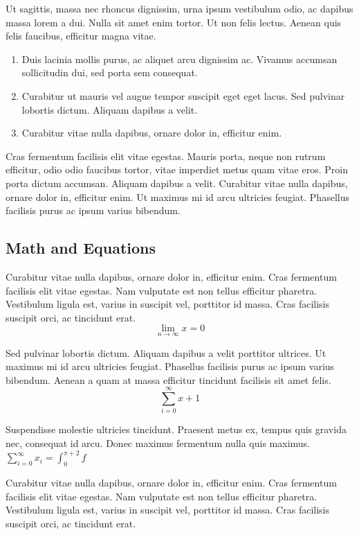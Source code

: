 \documentclass[sigconf, nonacm]{acmart}
\begin{document}
Ut sagittis, massa nec rhoncus dignissim, urna ipsum vestibulum odio, ac dapibus massa lorem a dui. Nulla sit amet enim tortor. Ut non felis lectus. Aenean quis felis faucibus, efficitur magna vitae. 

\begin{enumerate}
\item Duis lacinia mollis purus, ac aliquet arcu dignissim ac. Vivamus accumsan sollicitudin dui, sed porta sem consequat.
\item Curabitur ut mauris vel augue tempor suscipit eget eget lacus. Sed pulvinar lobortis dictum. Aliquam dapibus a velit.
\item Curabitur vitae nulla dapibus, ornare dolor in, efficitur enim.
\end{enumerate}

Cras fermentum facilisis elit vitae egestas. Mauris porta, neque non rutrum efficitur, odio odio faucibus tortor, vitae imperdiet metus quam vitae eros. Proin porta dictum accumsan. Aliquam dapibus a velit. Curabitur vitae nulla dapibus, ornare dolor in, efficitur enim. Ut maximus mi id arcu ultricies feugiat. Phasellus facilisis purus ac ipsum varius bibendum.

\subsection{Math and Equations}

Curabitur vitae nulla dapibus, ornare dolor in, efficitur enim. Cras fermentum facilisis elit vitae egestas. Nam vulputate est non tellus efficitur pharetra. Vestibulum ligula est, varius in suscipit vel, porttitor id massa. Cras facilisis suscipit orci, ac tincidunt erat.
\begin{equation}
  \lim_{n\rightarrow \infty}x=0
\end{equation}

Sed pulvinar lobortis dictum. Aliquam dapibus a velit porttitor ultrices. Ut maximus mi id arcu ultricies feugiat. Phasellus facilisis purus ac ipsum varius bibendum. Aenean a quam at massa efficitur tincidunt facilisis sit amet felis. 
\begin{displaymath}
  \sum_{i=0}^{\infty} x + 1
\end{displaymath}

Suspendisse molestie ultricies tincidunt. Praesent metus ex, tempus quis gravida nec, consequat id arcu. Donec maximus fermentum nulla quis maximus.
$ \sum_{i=0}^{\infty}x_i=\int_{0}^{\pi+2} f$

Curabitur vitae nulla dapibus, ornare dolor in, efficitur enim. Cras fermentum facilisis elit vitae egestas. Nam vulputate est non tellus efficitur pharetra. Vestibulum ligula est, varius in suscipit vel, porttitor id massa. Cras facilisis suscipit orci, ac tincidunt erat.
\end{document}

